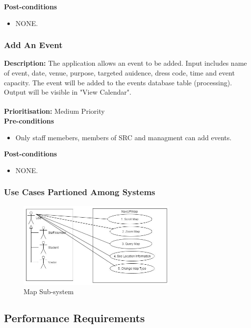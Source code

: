 \documentclass[runningheads,a4paper]{article}
\begin{document}
\textbf{Post-conditions}
\begin{itemize}
  	\item NONE.
\end{itemize}

\subsubsection{Add An Event}

\textbf{Description:} The application allows an event to be added. Input includes name of event, date, venue, purpose, targeted auidence, dress code, time and event capacity. The event will be added to the events database table (processing). Output will be visible in "View Calendar".\\\\
\noindent
\textbf{Prioritisation:} Medium Priority\\
  
  
\textbf{Pre-conditions}
\begin{itemize}
	\item Only staff memebers, members of SRC and managment can add events.
\end{itemize}
  
\textbf{Post-conditions}
\begin{itemize}
  	\item NONE.
\end{itemize}

\subsubsection{Use Cases Partioned Among Systems}
\begin{figure}[H]
   	\centering
   	\includegraphics[width=0.7\textwidth]{NavUP-Map-Subsystem.jpg}
   	\caption{Map Sub-system}
\end{figure}

\subsection{Performance Requirements}
\end{document}
